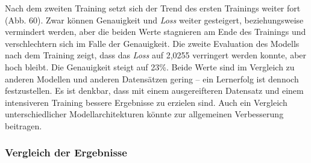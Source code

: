 \documentclass[a4paper,12pt,ngerman]{article}
\begin{document}
Nach dem zweiten Training setzt sich der Trend des ersten Trainings weiter fort (Abb. 60). Zwar können Genauigkeit und \textit{Loss} weiter gesteigert, beziehungsweise vermindert werden, aber die beiden Werte stagnieren am Ende des Trainings und verschlechtern sich im Falle der Genauigkeit. Die zweite Evaluation des Modells nach dem Training zeigt, dass das \textit{Loss} auf 2,0255 verringert werden konnte, aber hoch bleibt. Die Genauigkeit steigt auf 23\%. Beide Werte sind im Vergleich zu anderen Modellen und anderen Datensätzen gering -- ein Lernerfolg ist dennoch festzustellen. Es ist denkbar, dass mit einem ausgereifteren Datensatz und einem intensiveren Training bessere Ergebnisse zu erzielen sind. Auch ein Vergleich unterschiedlicher Modellarchitekturen könnte zur allgemeinen Verbesserung beitragen. \\

\subsubsection{Vergleich der Ergebnisse}
\end{document}
